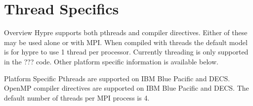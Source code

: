 \section{Thread Specifics}

\begin{description}
\item{Overview}
Hypre supports both pthreads and compiler directives.  Either of these may be
used alone or with MPI.  When compiled with threads the default model is for 
hypre to use 1 thread per processor.  Currently threading is only supported
in the ??? code.  
Other platform specific information 
is available below.

\item{Platform Specific}
Pthreads are supported on IBM Blue Pacific and DECS.  OpenMP compiler 
directives are supported on IBM Blue Pacific and DECS.  The default number of
threads per MPI process is 4. 
\end{description}    
